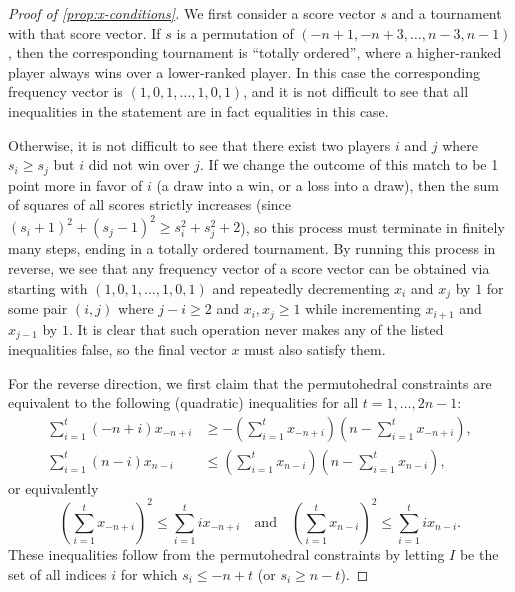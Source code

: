 \documentclass[letterpaper,reqno,11pt]{amsart}
\begin{document}
\begin{proof}[Proof of \cref{prop:x-conditions}]
    We first consider a score vector $s$ and a tournament with that score vector. If $s$ is a permutation of $(-n+1, -n+3, \dots, n-3, n-1)$, then the corresponding tournament is ``totally ordered'', where a higher-ranked player always wins over a lower-ranked player. In this case the corresponding frequency vector is $(1, 0, 1, \dots, 1, 0, 1)$, and it is not difficult to see that all inequalities in the statement are in fact equalities in this case. 
    
    Otherwise, it is not difficult to see that there exist two players $i$ and $j$ where $s_i \geq s_j$ but $i$ did not win over $j$. If we change the outcome of this match to be 1 point more in favor of $i$ (a draw into a win, or a loss into a draw), then the sum of squares of all scores strictly increases (since $(s_i+1)^2 + (s_j-1)^2 \geq s_i^2 + s_j^2 + 2$), so this process must terminate in finitely many steps, ending in a totally ordered tournament. By running this process in reverse, we see that any frequency vector of a score vector can be obtained via starting with $(1, 0, 1, \dots, 1, 0, 1)$ and repeatedly decrementing $x_i$ and $x_j$ by $1$ for some pair $(i,j)$ where $j - i \geq 2$ and $x_i, x_j\geq 1$ while incrementing $x_{i+1}$ and $x_{j-1}$ by $1$. It is clear that such operation never makes any of the listed inequalities false, so the final vector $x$ must also satisfy them.

    For the reverse direction, we first claim that the permutohedral constraints are equivalent to the following (quadratic) inequalities for all $t = 1, \dots, 2n-1$: \begin{align*}
        \sum_{i=1}^{t}(-n+i)x_{-n+i} &\geq -\left(\sum_{i=1}^{t}x_{-n+i}\right)\left(n-\sum_{i=1}^{t}x_{-n+i}\right), \\
        \sum_{i=1}^{t}(n-i)x_{n-i} &\leq \left(\sum_{i=1}^{t}x_{n-i}\right)\left(n-\sum_{i=1}^{t}x_{n-i}\right),
    \end{align*}
    or equivalently 
    \begin{equation}\label{eq2}
        \left(\sum_{i=1}^{t}x_{-n+i}\right)^2 \leq \sum_{i=1}^t ix_{-n+i}\quad \text{and}\quad \left(\sum_{i=1}^{t}x_{n-i}\right)^2 \leq \sum_{i=1}^t ix_{n-i}.
    \end{equation}
    These inequalities follow from the permutohedral constraints by letting $I$ be the set of all indices $i$ for which $s_i\leq -n+t$ (or $s_i\geq n-t$). 
    

\end{proof}
\end{document}
